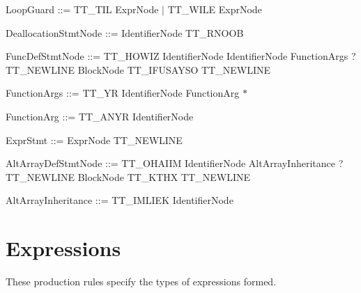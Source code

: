 \begin{DoxyParagraph}{}
Loop\+Guard \+:\+:= {\ttfamily T\+T\+\_\+\+T\+IL} Expr\+Node $\vert$ {\ttfamily T\+T\+\_\+\+W\+I\+LE} Expr\+Node
\end{DoxyParagraph}
\begin{DoxyParagraph}{}
Deallocation\+Stmt\+Node \+:\+:= Identifier\+Node {\ttfamily T\+T\+\_\+\+R\+N\+O\+OB} 
\end{DoxyParagraph}
\begin{DoxyParagraph}{}
Func\+Def\+Stmt\+Node \+:\+:= {\ttfamily T\+T\+\_\+\+H\+O\+W\+IZ} Identifier\+Node Identifier\+Node Function\+Args ? {\ttfamily T\+T\+\_\+\+N\+E\+W\+L\+I\+NE} Block\+Node {\ttfamily T\+T\+\_\+\+I\+F\+U\+S\+A\+Y\+SO} {\ttfamily T\+T\+\_\+\+N\+E\+W\+L\+I\+NE} 
\end{DoxyParagraph}
\begin{DoxyParagraph}{}
Function\+Args \+:\+:= {\ttfamily T\+T\+\_\+\+YR} Identifier\+Node Function\+Arg $\ast$
\end{DoxyParagraph}
\begin{DoxyParagraph}{}
Function\+Arg \+:\+:= {\ttfamily T\+T\+\_\+\+A\+N\+YR} Identifier\+Node
\end{DoxyParagraph}
\begin{DoxyParagraph}{}
Expr\+Stmt \+:\+:= Expr\+Node {\ttfamily T\+T\+\_\+\+N\+E\+W\+L\+I\+NE} 
\end{DoxyParagraph}
\begin{DoxyParagraph}{}
Alt\+Array\+Def\+Stmt\+Node \+:\+:= {\ttfamily T\+T\+\_\+\+O\+H\+A\+I\+IM} Identifier\+Node Alt\+Array\+Inheritance ? {\ttfamily T\+T\+\_\+\+N\+E\+W\+L\+I\+NE} Block\+Node {\ttfamily T\+T\+\_\+\+K\+T\+HX} {\ttfamily T\+T\+\_\+\+N\+E\+W\+L\+I\+NE} 
\end{DoxyParagraph}
\begin{DoxyParagraph}{}
Alt\+Array\+Inheritance \+:\+:= {\ttfamily T\+T\+\_\+\+I\+M\+L\+I\+EK} Identifier\+Node
\end{DoxyParagraph}
\hypertarget{lolebnf_exprebnf}{}\section{Expressions}\label{lolebnf_exprebnf}
These production rules specify the types of expressions formed.

